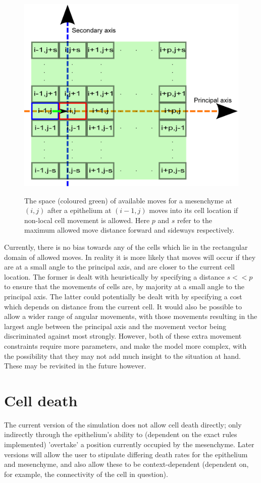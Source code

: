 \documentclass[pdftex,10pt,a4paper]{article}
\begin{document}
\begin{figure}[t] 
\centering
\scalebox{0.5} 
{\includegraphics{rectangular.eps}}
\caption{The space (coloured green) of available moves for a mesenchyme at $(i,j)$ after a epithelium at $(i-1,j)$ moves into its cell location if non-local cell movement is allowed. Here $p$ and $s$ refer to the maximum allowed move distance forward and sideways respectively.}\label{fig:rectangular}
\end{figure} 

Currently, there is no bias towards any of the cells which lie in the rectangular domain of allowed moves. In reality it is more likely that moves will occur if they are at a small angle to the principal axis, and are closer to the current cell location. The former is dealt with heuristically by specifying a distance $s<<p$ to ensure that the movements of cells are, by majority at a small angle to the principal axis. The latter could potentially be dealt with by specifying a cost which depends on distance from the current cell. It would also be possible to allow a wider range of angular movements, with those movements resulting in the largest angle between the principal axis and the movement vector being discriminated against most strongly. However, both of these extra movement constraints require more parameters, and make the model more complex, with the possibility that they may not add much insight to the situation at hand. These may be revisited in the future however.

\section{Cell death}
The current version of the simulation does not allow cell death directly; only indirectly through the epithelium's ability to (dependent on the exact rules implemented) 'overtake' a position currently occupied by the mesenchyme. Later versions will allow the user to stipulate differing death rates for the epithelium and mesenchyme, and also allow these to be context-dependent (dependent on, for example, the connectivity of the cell in question).
\end{document}
